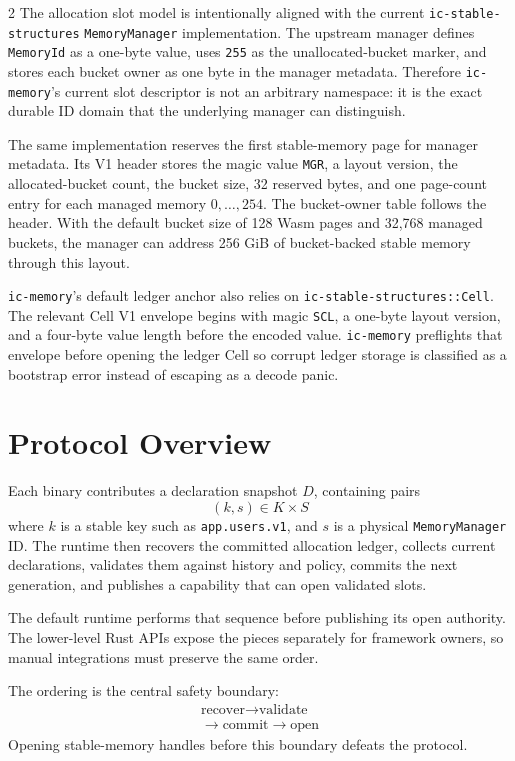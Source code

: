 \documentclass[11pt]{article}
\begin{document}
\begin{multicols}{2}
The allocation slot model is intentionally aligned with the current
\texttt{ic-stable-structures} \texttt{MemoryManager} implementation. The
upstream manager defines \texttt{MemoryId} as a one-byte value, uses
\texttt{255} as the unallocated-bucket marker, and stores each bucket owner as
one byte in the manager metadata. Therefore \texttt{ic-memory}'s current slot
descriptor is not an arbitrary namespace: it is the exact durable ID domain that
the underlying manager can distinguish.

The same implementation reserves the first stable-memory page for manager
metadata. Its V1 header stores the magic value \texttt{MGR}, a layout version,
the allocated-bucket count, the bucket size, 32 reserved bytes, and one
page-count entry for each managed memory \(0,\ldots,254\). The bucket-owner
table follows the header. With the default bucket size of 128 Wasm pages and
32,768 managed buckets, the manager can address 256 GiB of bucket-backed stable
memory through this layout.

\texttt{ic-memory}'s default ledger anchor also relies on
\texttt{ic-stable-structures::Cell}. The relevant Cell V1 envelope begins with
magic \texttt{SCL}, a one-byte layout version, and a four-byte value length
before the encoded value. \texttt{ic-memory} preflights that envelope before
opening the ledger Cell so corrupt ledger storage is classified as a bootstrap
error instead of escaping as a decode panic.

\section{Protocol Overview}

Each binary contributes a declaration snapshot \(D\), containing pairs
\[
  (k,s) \in K \times S
\]
where \(k\) is a stable key such as \texttt{app.users.v1}, and \(s\) is a
physical \texttt{MemoryManager} ID. The runtime then recovers the committed
allocation ledger, collects current declarations, validates them against history
and policy, commits the next generation, and publishes a capability that can
open validated slots.

The default runtime performs that sequence before publishing its open authority.
The lower-level Rust APIs expose the pieces separately for framework owners, so
manual integrations must preserve the same order.

The ordering is the central safety boundary:
\[
  \boxed{
    \begin{gathered}
    \text{recover} \rightarrow \text{validate}\\
    \rightarrow \text{commit} \rightarrow \text{open}
    \end{gathered}
  }
\]
Opening stable-memory handles before this boundary defeats the protocol.


\end{multicols}
\end{document}
